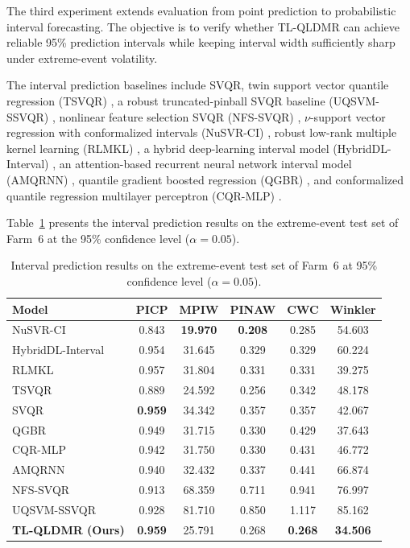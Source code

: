 \documentclass[a4paper]{cas-sc}
\begin{document}
The third experiment extends evaluation from point prediction to probabilistic interval forecasting. The objective is to verify whether TL-QLDMR can achieve reliable 95\% prediction intervals while keeping interval width sufficiently sharp under extreme-event volatility.

The interval prediction baselines include SVQR, twin support vector quantile regression (TSVQR) \citep{tsvqr2023}, a robust truncated-pinball SVQR baseline (UQSVM-SSVQR) \citep{wang2024ssvqr}, nonlinear feature selection SVQR (NFS-SVQR) \citep{ye2025nfs}, $\nu$-support vector regression with conformalized intervals (NuSVR-CI) \citep{romano2019cqr}, robust low-rank multiple kernel learning (RLMKL) \citep{jiang2021rlmkl}, a hybrid deep-learning interval model (HybridDL-Interval) \citep{hybriddl2025}, an attention-based recurrent neural network interval model (AMQRNN) \citep{amqrnn2025}, quantile gradient boosted regression (QGBR) \citep{hu2025ncqgbr}, and conformalized quantile regression multilayer perceptron (CQR-MLP) \citep{hu2025nescqr}.

Table~\ref{tab:exp3_results} presents the interval prediction results on the extreme-event test set of Farm~6 at the 95\% confidence level ($\alpha = 0.05$).

\begin{table}[ht]
\centering
\caption{Interval prediction results on the extreme-event test set of Farm~6 at 95\% confidence level ($\alpha = 0.05$).}
\setlength{\tabcolsep}{4mm}
\begin{tabular}{lccccc}
\toprule
Model & PICP & MPIW & PINAW & CWC & Winkler \\
\midrule
NuSVR-CI            & 0.843 & \textbf{19.970} & \textbf{0.208} & 0.285 & 54.603 \\
HybridDL-Interval   & 0.954 & 31.645 & 0.329 & 0.329 & 60.224 \\
RLMKL               & 0.957 & 31.804 & 0.331 & 0.331 & 39.275 \\
TSVQR               & 0.889 & 24.592 & 0.256 & 0.342 & 48.178 \\
SVQR       & \textbf{0.959} & 34.342 & 0.357 & 0.357 & 42.067 \\
QGBR                & 0.949 & 31.715 & 0.330 & 0.429 & 37.643 \\
CQR-MLP             & 0.942 & 31.750 & 0.330 & 0.431 & 46.772 \\
AMQRNN              & 0.940 & 32.432 & 0.337 & 0.441 & 66.874 \\
NFS-SVQR            & 0.913 & 68.359 & 0.711 & 0.941 & 76.997 \\
UQSVM-SSVQR         & 0.928 & 81.710 & 0.850 & 1.117 & 85.162 \\
\textbf{TL-QLDMR (Ours)} & \textbf{0.959} & 25.791 & 0.268 & \textbf{0.268} & \textbf{34.506} \\
\bottomrule
\end{tabular}
\label{tab:exp3_results}
\end{table}
\end{document}
